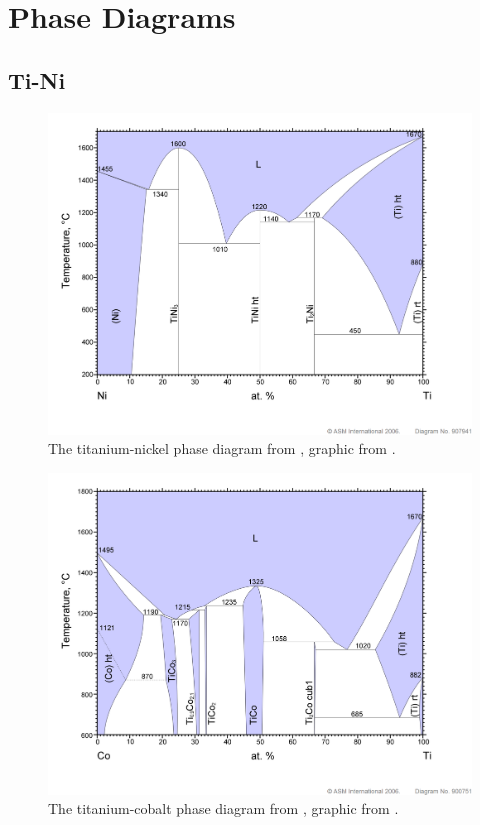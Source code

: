 
\chapter{Phase Diagrams}
\label{chap:phase_diagrams}


\graphicspath{{Appendix2/Figs/}}

\section{Ti-Ni}

\begin{figure}[htb!]
\centering
\includegraphics[width=\textwidth]{Ti-Ni}
\caption{The titanium-nickel phase diagram from \cite{Le1991}, graphic from \cite{asm}.}
\end{figure}

\begin{figure}[htb!]
\centering
\includegraphics[width=\textwidth]{Ti-Co}
\caption{The titanium-cobalt phase diagram from \cite{murray1990co}, graphic from \cite{asm}.}
\end{figure}

